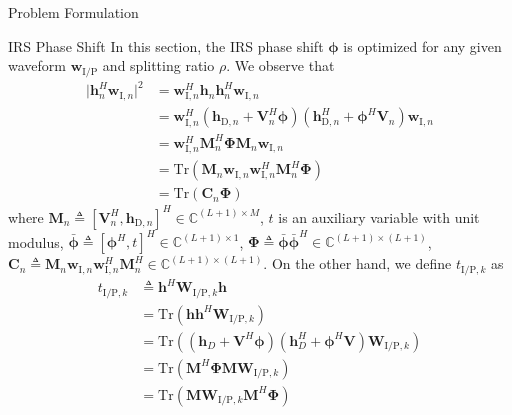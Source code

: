 \documentclass[journal]{IEEEtran}
\begin{document}
\begin{section}{Problem Formulation}
		\begin{subsection}{IRS Phase Shift}
			In this section, the IRS phase shift $\boldsymbol{\phi}$ is optimized for any given waveform $\boldsymbol{w}_{\mathrm{I/P}}$ and splitting ratio $\rho$. We observe that
			\begin{align}
				\lvert \boldsymbol{h}_{n}^H\boldsymbol{w}_{\mathrm{I},n} \rvert^2
				& = \boldsymbol{w}_{\mathrm{I},n}^H\boldsymbol{h}_n\boldsymbol{h}_n^H\boldsymbol{w}_{\mathrm{I},n}\nonumber\\
				& = \boldsymbol{w}_{\mathrm{I},n}^H(\boldsymbol{h}_{\mathrm{D},n}+\boldsymbol{V}_n^H\boldsymbol{\phi})(\boldsymbol{h}_{\mathrm{D},n}^H+\boldsymbol{\phi}^H\boldsymbol{V}_n)\boldsymbol{w}_{\mathrm{I},n}\nonumber\\
				& = \boldsymbol{w}_{\mathrm{I},n}^H\boldsymbol{M}_n^H\boldsymbol{\Phi}\boldsymbol{M}_n\boldsymbol{w}_{\mathrm{I},n}\nonumber\\
				& = \mathrm{Tr}(\boldsymbol{M}_n\boldsymbol{w}_{\mathrm{I},n}\boldsymbol{w}_{\mathrm{I},n}^H\boldsymbol{M}_n^H\boldsymbol{\Phi})\nonumber\\
				& = \mathrm{Tr}(\boldsymbol{C}_n\boldsymbol{\Phi})
			\end{align}
			where $\boldsymbol{M}_n \triangleq [\boldsymbol{V}_n^H, \boldsymbol{h}_{\mathrm{D},n}]^H \in \mathbb{C}^{(L+1) \times M}$, $t$ is an auxiliary variable with unit modulus, $\bar{\boldsymbol{\phi}} \triangleq [\boldsymbol{\phi}^H, t]^H \in \mathbb{C}^{(L+1) \times 1}$, $\boldsymbol{\Phi} \triangleq \bar{\boldsymbol{\phi}}\bar{\boldsymbol{\phi}}^H \in \mathbb{C}^{(L+1) \times (L+1)}$, $\boldsymbol{C}_n \triangleq \boldsymbol{M}_n\boldsymbol{w}_{\mathrm{I},n}\boldsymbol{w}_{\mathrm{I},n}^H\boldsymbol{M}_n^H \in \mathbb{C}^{(L+1)\times(L+1)}$. On the other hand, we define $t_{\mathrm{I/P},k}$ as
			\begin{align}
				t_{\mathrm{I/P},k}
				& \triangleq \boldsymbol{h}^H\boldsymbol{W}_{\mathrm{I/P},k}\boldsymbol{h}\nonumber\\
				& = \mathrm{Tr}(\boldsymbol{h}\boldsymbol{h}^H\boldsymbol{W}_{\mathrm{I/P},k})\nonumber\\
				& = \mathrm{Tr}\left((\boldsymbol{h}_{D}+\boldsymbol{V}^H\boldsymbol{\phi})(\boldsymbol{h}_{D}^H+\boldsymbol{\phi}^H\boldsymbol{V})\boldsymbol{W}_{\mathrm{I/P},k}\right)\nonumber\\
				& = \mathrm{Tr}(\boldsymbol{M}^H\boldsymbol{\Phi}\boldsymbol{M}\boldsymbol{W}_{\mathrm{I/P},k})\nonumber\\
				& = \mathrm{Tr}(\boldsymbol{M}\boldsymbol{W}_{\mathrm{I/P},k}\boldsymbol{M}^H\boldsymbol{\Phi})\nonumber\\

\end{align}
\end{subsection}
\end{section}
\end{document}
